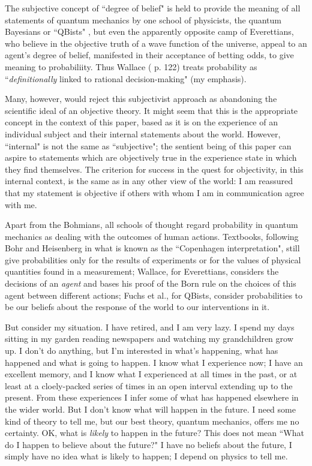 \documentclass[12pt,a4paper,reqno]{article}
\renewcommand{\(}{\left(}
\renewcommand{\)}{\right)}
\newcommand{\<}{\langle}
\renewcommand{\>}{\rangle}
\theoremstyle{plain} %
\begin{document}
The subjective concept of ``degree of belief" is held to provide the meaning of all statements of quantum mechanics by one school of physicists, the quantum Bayesians or ``QBists" \cite{QBism}, but even the apparently opposite camp of Everettians, who believe in the objective truth of a wave function of the universe, appeal to an agent's degree of belief, manifested in their acceptance of betting odds, to give meaning to probabiliity. Thus Wallace (\cite{Wallace:multiverse} p. 122) treats probability as ``\emph{definitionally} linked to rational decision-making" (my emphasis). 

Many, however, would reject this subjectivist approach as abandoning the scientific ideal of an objective theory. It might seem that this is the appropriate concept in the context of this paper, based as it is on the experience of an individual subject and their internal statements about the world. However, ``internal" is not the same as ``subjective"; the sentient being of this paper can aspire to statements which are objectively true in the experience state in which they find themselves. The criterion for success in the quest for objectivity, in this internal context, is the same as in any other view of the world: I am reassured that my statement is objective if others with whom I am in communication agree with me.

Apart from the Bohmians, all schools of thought regard probability in quantum mechanics as dealing with the outcomes of human actions. Textbooks, following Bohr and Heisenberg in what is known as the ``Copenhagen interpretation", still give probabilities only for the results of experiments or for the values of physical quantities found in a measurement; Wallace, for Everettians, considers the decisions of an \emph{agent} and bases his proof of the Born rule on the choices of this agent between different actions; Fuchs et al., for QBists, consider probabilities to be our beliefs about the response of the world to our interventions in it.

But consider my situation. I have retired, and I am very lazy. I spend my days sitting in my garden reading newspapers and watching my grandchildren grow up. I don't do anything, but I'm interested in what's happening, what has happened and what is going to happen. I know what I experience now; I have an excellent memory, and I know what I experienced at all times in the past, or at least at a cloely-packed series of times in an open interval extending up to the present. From these experiences I infer some of what has happened elsewhere in the wider world. But I don't know what will happen in the future. I need some kind of theory to tell me, but our best theory, quantum mechanics, offers me no certainty. OK, what is \emph{likely} to happen in the future? This does not mean ``What do I happen to believe about the future?" I have no beliefs about the future, I simply have no idea what is likely to happen; I depend on physics to tell me.
\end{document}
